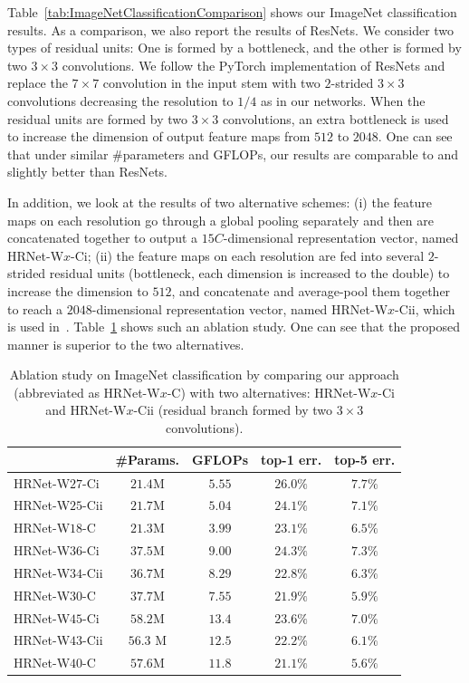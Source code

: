 \documentclass[10pt,journal,compsoc]{IEEEtran}
\begin{document}
Table~\ref{tab:ImageNetClassificationComparison}
shows our ImageNet classification results.
As a comparison, we also report the results of ResNets. 
We consider two types of residual units:
One is formed by a bottleneck,
and the other is formed by two $3 \times3 $ convolutions. We follow the 
PyTorch implementation of ResNets and replace the $7 \times 7$ 
convolution in the input stem with two 
$2$-strided $3 \times 3$ convolutions decreasing the resolution to $1/4$ 
as in our networks. When the residual units are formed by two $3 \times3 $ convolutions,
an extra bottleneck is used to increase the dimension of output feature maps from $512$ to $2048$.
One can see that under similar \#parameters
and GFLOPs, our results are comparable to and slightly better
than ResNets.

In addition, we look at the results 
of two alternative schemes:
(i) the feature maps on each resolution go through a global pooling separately and then are concatenated 
together to output a $15C$-dimensional representation vector,
named HRNet-W$x$-Ci;
(ii) the feature maps on each resolution are fed into several $2$-strided residual units (bottleneck, each dimension is increased to the double)
to increase the dimension to $512$,
and concatenate and average-pool them together to reach a $2048$-dimensional representation vector,
named HRNet-W$x$-Cii,
which is used in~\cite{SunXLW19}.
Table~\ref{tab:ImageNetClassificationAblationStudy}
shows such an ablation study. 
One can see that the proposed manner is superior to the two alternatives.
	

	\begin{table}[ht]
	\setlength{\tabcolsep}{15pt}
	\tiny
	\scriptsize
	\centering
	\caption{Ablation study on ImageNet classification
	by comparing our approach (abbreviated as HRNet-W$x$-C) with two alternatives: HRNet-W$x$-Ci and HRNet-W$x$-Cii (residual branch formed by two $3\times 3$ convolutions).}
	\begin{tabular}{l|cc|cc}
		\hline
		& \#Params. & GFLOPs & top-1 err. & top-5 err.\\
		\hline 
	    HRNet-W$27$-Ci& $21.4$M & $5.55$ & $26.0\%$ & $7.7\%$ \\
        HRNet-W$25$-Cii& $21.7$M & $5.04$ & $24.1\%$ & $7.1\%$ \\
	    HRNet-W$18$-C& $21.3$M & $3.99$ & $\mathbf{23.1}\%$ & $\mathbf{6.5\%}$ \\
        \hline
        HRNet-W$36$-Ci& $37.5$M & $9.00$ & $24.3\%$ & $7.3\%$ \\
        HRNet-W$34$-Cii& $36.7$M & $8.29$ & $22.8\%$ & $6.3\%$ \\
	    HRNet-W$30$-C& $37.7$M & $7.55$ & $\mathbf{21.9\%}$ & $\mathbf{5.9\%}$ \\
        \hline
        HRNet-W$45$-Ci& $58.2$M & $13.4$ & $23.6\%$ & $7.0\%$ \\
        HRNet-W$43$-Cii& $56.3$ M & $12.5$ & $22.2\%$ & $6.1\%$ \\
	    HRNet-W$40$-C& $57.6$M & $11.8$ & $\mathbf{21.1\%}$ & $\mathbf{5.6\%}$ \\
	    \hline
	\end{tabular}
	\label{tab:ImageNetClassificationAblationStudy}
	\end{table}
\end{document}
